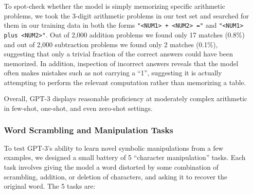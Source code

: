 \documentclass{article}
\begin{document}
To spot-check whether the model is simply memorizing specific arithmetic problems, we took the 3-digit arithmetic problems in our test set and searched for them in our training data in both the forms \texttt{"<NUM1> + <NUM2> ="} and \texttt{"<NUM1> plus <NUM2>"}.  Out of 2,000 addition problems we found only 17 matches (0.8\%) and out of 2,000 subtraction problems we found only 2 matches (0.1\%), suggesting that only a trivial fraction of the correct answers could have been memorized.  In addition, inspection of incorrect answers reveals that the model often makes mistakes such as not carrying a ``1'', suggesting it is actually attempting to perform the relevant computation rather than memorizing a table.

Overall, GPT-3 displays reasonable proficiency at moderately complex arithmetic in few-shot, one-shot, and even zero-shot settings.

         
        \subsubsection{Word Scrambling and Manipulation Tasks}
        \label{section:Word_Scrambling_and_Manipulation_Tasks}
        
To test GPT-3's ability to learn novel symbolic manipulations from a few examples, we designed a small battery of 5 ``character manipulation'' tasks.  Each task involves giving the model a word distorted by some combination of scrambling, addition, or deletion of characters, and asking it to recover the original word.  The 5 tasks are:
\end{document}
